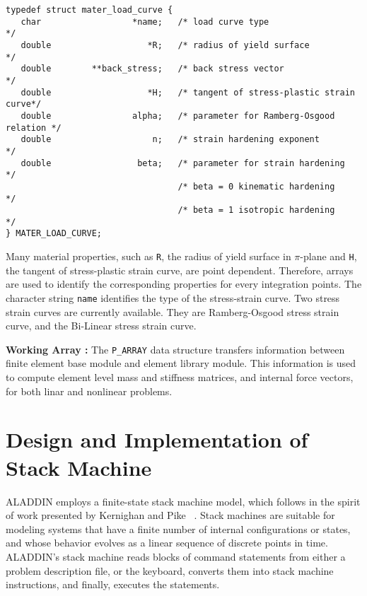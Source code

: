 \begin{footnotesize}
\begin{verbatim}
typedef struct mater_load_curve {
   char                  *name;   /* load curve type                       */
   double                   *R;   /* radius of yield surface               */
   double        **back_stress;   /* back stress vector                    */
   double                   *H;   /* tangent of stress-plastic strain curve*/
   double                alpha;   /* parameter for Ramberg-Osgood relation */
   double                    n;   /* strain hardening exponent             */
   double                 beta;   /* parameter for strain hardening        */
                                  /* beta = 0 kinematic hardening          */
                                  /* beta = 1 isotropic hardening          */
} MATER_LOAD_CURVE;
\end{verbatim}
\end{footnotesize}

\vspace{0.05 in}\noindent
Many material properties, such as {\tt R},
the radius of yield surface in $\pi$-plane and {\tt H},
the tangent of stress-plastic strain curve, are point dependent.
Therefore, arrays are used to identify the
corresponding properties for every integration points.
The character string {\tt name} identifies the type of the stress-strain curve.
Two stress strain curves are currently available.
They are Ramberg-Osgood stress strain curve,
and the Bi-Linear stress strain curve.

\vspace{0.20 in}\noindent
{\bf Working Array :}
The {\tt P\_ARRAY} data structure transfers information between
finite element base module and element library module.
This information is used to compute element level mass and
stiffness matrices, and internal force vectors,
for both linar and nonlinear problems.
 
\section{Design and Implementation of Stack Machine}

\vspace{0.15 in}
\noindent\hspace{0.50 in}
ALADDIN employs a finite-state stack machine model, which follows in the
spirit of work presented by Kernighan and Pike ~\cite{kernighan-pike}.
Stack machines are suitable for modeling systems that
have a finite number of internal configurations or states,
and whose behavior evolves as a linear sequence of discrete points in time.
ALADDIN's stack machine reads blocks of command statements from either a problem
description file, or the keyboard, converts them into stack machine instructions,
and finally, executes the statements.

